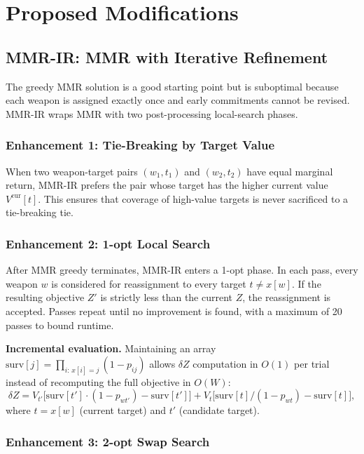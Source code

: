 \documentclass[10pt,conference]{IEEEtran}
\begin{document}
\section{Proposed Modifications}
\label{sec:mods}

\subsection{MMR-IR: MMR with Iterative Refinement}
\label{sec:mmrir}

The greedy MMR solution is a good starting point but is suboptimal because
each weapon is assigned exactly once and early commitments cannot be revised.
MMR-IR wraps MMR with two post-processing local-search phases.

\subsubsection{Enhancement 1: Tie-Breaking by Target Value}

When two weapon-target pairs $(w_1, t_1)$ and $(w_2, t_2)$ have equal marginal
return, MMR-IR prefers the pair whose target has the higher current value
$V^{\text{cur}}[t]$.  This ensures that coverage of high-value targets is
never sacrificed to a tie-breaking tie.

\subsubsection{Enhancement 2: 1-opt Local Search}

After MMR greedy terminates, MMR-IR enters a 1-opt phase.  In each pass, every
weapon $w$ is considered for reassignment to every target $t \neq x[w]$.  If
the resulting objective $Z'$ is strictly less than the current $Z$, the
reassignment is accepted.  Passes repeat until no improvement is found, with a
maximum of 20 passes to bound runtime.

\textbf{Incremental evaluation.}  Maintaining an array
$\text{surv}[j] = \prod_{i:\, x[i]=j}(1-p_{ij})$ allows $\delta Z$ computation
in $O(1)$ per trial instead of recomputing the full objective in $O(W)$:
\[
  \delta Z = V_{t'} \bigl[\text{surv}[t'] \cdot (1-p_{wt'}) - \text{surv}[t']\bigr]
           + V_t \bigl[\text{surv}[t] / (1-p_{wt}) - \text{surv}[t]\bigr],
\]
where $t = x[w]$ (current target) and $t'$ (candidate target).

\subsubsection{Enhancement 3: 2-opt Swap Search}
\end{document}
